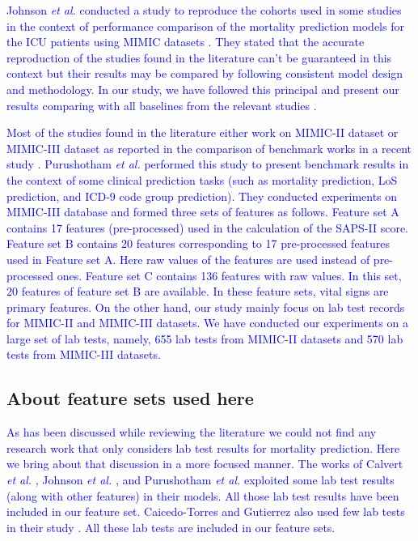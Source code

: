 \textcolor{blue}{Johnson \textit{et al.} conducted a study to reproduce the cohorts used in some studies in the context of performance comparison of the mortality prediction models for the ICU patients using MIMIC datasets \cite{Johnson2nd2017}. They stated that the accurate reproduction of the studies found in the literature can't be guaranteed in this context but their results may be compared by following consistent model design and methodology. In our study, we have followed this principal and present our results comparing with all baselines from the relevant studies \cite{mehedy-masud:2017:fvc, mehedy-masud:2018:frmwrk}.}

\textcolor{blue}{Most of the studies found in the literature either work on MIMIC-II dataset or MIMIC-III dataset as reported in the comparison of benchmark works in a recent study \cite{Purushotham2018}. Purushotham \textit{et al.} performed this study \cite{Purushotham2018} to present benchmark results in the context of some clinical prediction tasks (such as mortality prediction, LoS prediction, and ICD-9 code group prediction). They conducted experiments on MIMIC-III database and formed three sets of features as follows. Feature set A contains 17 features (pre-processed) used in the calculation of the SAPS-II score. Feature set B contains 20 features corresponding to 17 pre-processed features used in Feature set A. Here raw values of the features are used instead of pre-processed ones. Feature set C contains 136 features with raw values. In this set, 20 features of feature set B are available. In these feature sets, vital signs are primary features. On the other hand, our study mainly focus on lab test records for MIMIC-II and MIMIC-III datasets. We have conducted our experiments on a large set of lab tests, namely, 655 lab tests from MIMIC-II datasets and 570 lab tests from MIMIC-III datasets.}  
 
\subsection{About feature sets used here}
\textcolor{blue}{As has been discussed while reviewing the literature we could not find any research work that only considers lab test results for mortality prediction. Here we bring about that discussion in a more focused manner. The works of Calvert \textit{et al.} \cite{Calvert2016}, Johnson \textit{et al.} \cite{Johnson2nd2017}, and Purushotham \textit{et al.} \cite{Purushotham2018} exploited some lab test results (along with other features) in their models. All those lab test results have been included in our feature set. Caicedo-Torres and Gutierrez also used few lab tests in their study \cite{Torres2019}. All these lab tests are included in our feature sets.} 
